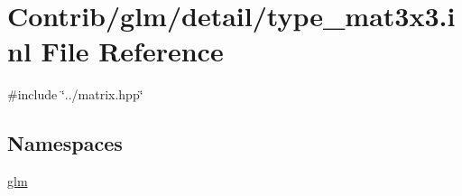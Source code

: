 \hypertarget{type__mat3x3_8inl}{}\section{Contrib/glm/detail/type\+\_\+mat3x3.inl File Reference}
\label{type__mat3x3_8inl}
{\ttfamily \#include \char`\"{}../matrix.\+hpp\char`\"{}}\newline
\subsection*{Namespaces}
\begin{DoxyCompactItemize}
\item 
 \mbox{\hyperlink{namespaceglm}{glm}}
\end{DoxyCompactItemize}
